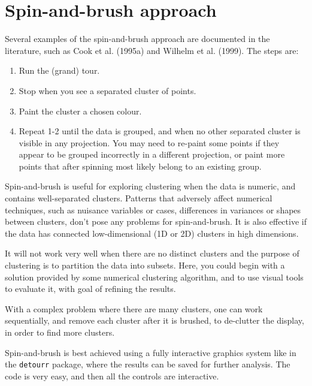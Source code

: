 \documentclass[
  letterpaper,
]{krantz}
\providecommand{\tightlist}{%
  \setlength{\itemsep}{0pt}\setlength{\parskip}{0pt}}\usepackage{longtable,booktabs,array}
\begin{document}

\chapter{Spin-and-brush approach}\label{sec-clust-graphics}

 

Several examples of the spin-and-brush approach are documented in the
literature, such as Cook et al. (1995a) and Wilhelm et al. (1999). The
steps are:

\begin{enumerate}
\def\labelenumi{\arabic{enumi}.}
\tightlist
\item
  Run the (grand) tour.
\item
  Stop when you see a separated cluster of points.
\item
  Paint the cluster a chosen colour.
\item
  Repeat 1-2 until the data is grouped, and when no other separated
  cluster is visible in any projection. You may need to re-paint some
  points if they appear to be grouped incorrectly in a different
  projection, or paint more points that after spinning most likely
  belong to an existing group.
\end{enumerate}

Spin-and-brush is useful for exploring clustering when the data is
numeric, and contains well-separated clusters. Patterns that adversely
affect numerical techniques, such as nuisance variables or cases,
differences in variances or shapes between clusters, don't pose any
problems for spin-and-brush. It is also effective if the data has
connected low-dimensional (1D or 2D) clusters in high dimensions.

It will not work very well when there are no distinct clusters and the
purpose of clustering is to partition the data into subsets. Here, you
could begin with a solution provided by some numerical clustering
algorithm, and to use visual tools to evaluate it, with goal of refining
the results.

With a complex problem where there are many clusters, one can work
sequentially, and remove each cluster after it is brushed, to de-clutter
the display, in order to find more clusters.

Spin-and-brush is best achieved using a fully interactive graphics
system like in the \texttt{detourr} package, where the results can be
saved for further analysis. The code is very easy, and then all the
controls are interactive.
\end{document}
